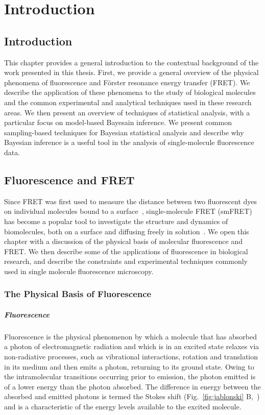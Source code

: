 \chapter{Introduction}
\label{chap:intro}
\section{Introduction}
This chapter provides a general introduction to the contextual background of the work presented in this thesis. First, we provide a general overview of the physical phenomena of fluorescence and F\"{o}rster resonance energy transfer (FRET). We describe the application of these phenomena to the study of biological molecules and the common experimental and analytical techniques used in these research areas. We then present an overview of techniques of statistical analysis, with a particular focus on model-based Bayesain inference. We present common sampling-based techniques for Bayesian statistical analysis and describe why Bayesian inference is a useful tool in the analysis of single-molecule fluorescence data.

\section{Fluorescence and FRET}
Since FRET was first used to measure the distance between two fluorescent dyes on individual molecules bound to a surface~\cite{ha96}, single-molecule FRET (smFRET) has become a popular tool to investigate the structure and dynamics of biomolecules, both on a surface and diffusing freely in solution~\cite{haran03, schuler02, weiss00}. We open this chapter with a discussion of the physical basis of molecular fluorescence and FRET. We then describe some of the applications of fluorescence in biological research, and describe the constraints and experimental techniques commonly used in single molecule fluorescence microscopy.

\subsection{The Physical Basis of Fluorescence}
\paragraph{Fluorescence}
Fluorescence is the physical phenomenon by which a molecule that has absorbed a photon of electromagnetic radiation and which is in an excited state relaxes via non-radiative processes, such as vibrational interactions, rotation and translation in its medium and then  emits a photon, returning to its ground state. Owing to the intramolecular transitions occurring prior to emission, the photon emitted is of a lower energy than the photon absorbed. The difference in energy between the absorbed and emitted photons is termed the Stokes shift (Fig.~\ref{fig:jablonski} B,~\cite{Albani2011}) and is a characteristic of the energy levels available to the excited molecule. 

